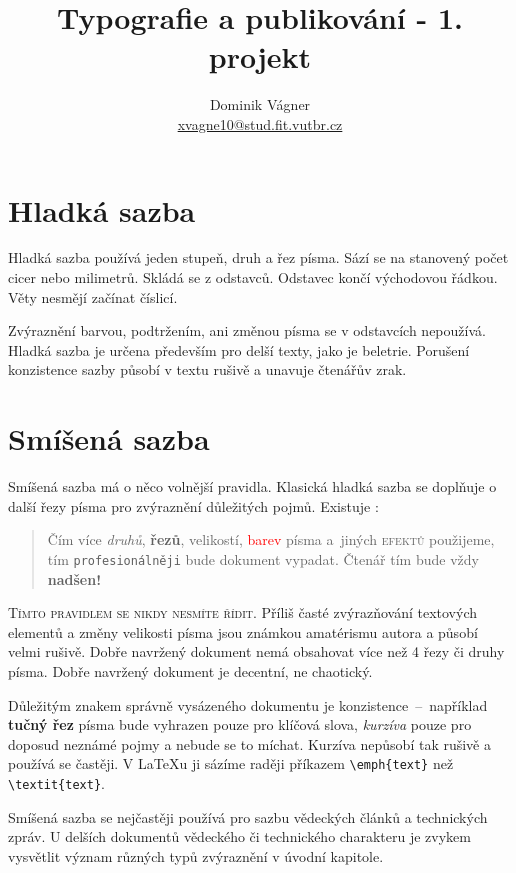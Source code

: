 \documentclass[a4paper, 10pt, twocolumn]{article}
\title{Typografie a publikování - 1. projekt}
\author{Dominik Vágner \\ \href{mailto:xvagne10@stud.fit.vutbr.cz}{xvagne10@stud.fit.vutbr.cz}}
\date{}
\begin{document}
\maketitle

\section{Hladká sazba}
Hladká sazba používá jeden stupeň, druh a řez písma.
Sází se na stanovený počet cicer nebo milimetrů.
Skládá se z odstavců. Odstavec končí východovou řádkou.
Věty nesmějí začínat číslicí.

    Zvýraznění barvou, podtržením, ani změnou písma se v odstavcích nepoužívá.
Hladká sazba je určena především pro delší texty, jako je beletrie.
Porušení konzistence sazby působí v textu rušivě a unavuje čtenářův zrak.

\section{Smíšená sazba}
Smíšená sazba má o něco volnější pravidla. Klasická hladká
sazba se doplňuje o další řezy písma pro zvýraznění důležitých pojmů. Existuje :

\begin{quotation}
Čím více \emph {druhů}, \textbf {řezů}, {\tiny velikostí}, \textcolor{red}{barev} písma a~jiných \textsc{efektů} použijeme, tím \texttt{profesionálněji}
bude {\Large {}\selectfont dokument} vypadat.
{\huge Č}{\LARGE t}{\Large e}{\large n}á{\small ř} {\footnotesize t}{\scriptsize í}{\tiny m} bude vždy {\Huge \textbf{nadšen!}}
\end{quotation}

    \textsc{Tímto pravidlem se nikdy nesmíte řídit}. Příliš časté zvýrazňování textových elementů a změny velikosti
písma jsou známkou amatérismu autora a působí velmi rušivě. Dobře navržený dokument nemá obsahovat více než
4 řezy či druhy písma. Dobře navržený dokument je decentní, ne chaotický.

    Důležitým znakem správně vysázeného dokumentu je konzistence \,--\ například \textbf{tučný řez} písma bude vyhrazen pouze pro klíčová
slova, \emph{kurzíva} pouze pro doposud neznámé pojmy a nebude se to míchat. Kurzíva nepůsobí tak rušivě a používá se častěji. 
V \LaTeX u ji sázíme raději příkazem \verb$\emph{text}$ než \verb$\textit{text}$.

    Smíšená sazba se nejčastěji používá pro sazbu vědeckých článků a technických zpráv. U delších dokumentů vědeckého či 
technického charakteru je zvykem vysvětlit význam různých typů zvýraznění v úvodní kapitole.
\end{document}
